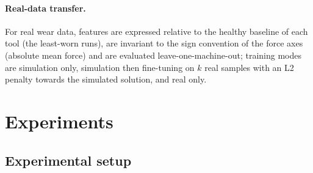 \documentclass[11pt]{article}
\begin{document}
\paragraph{Real-data transfer.} For real wear data, features are expressed relative to the healthy baseline of each tool (the least-worn runs), are invariant to the sign convention of the force axes (absolute mean force) and are evaluated leave-one-machine-out; training modes are simulation only, simulation then fine-tuning on $k$ real samples with an L2 penalty towards the simulated solution, and real only.

\section{Experiments}\label{sec:exp}
\subsection{Experimental setup}\label{sec:setup}
\end{document}
